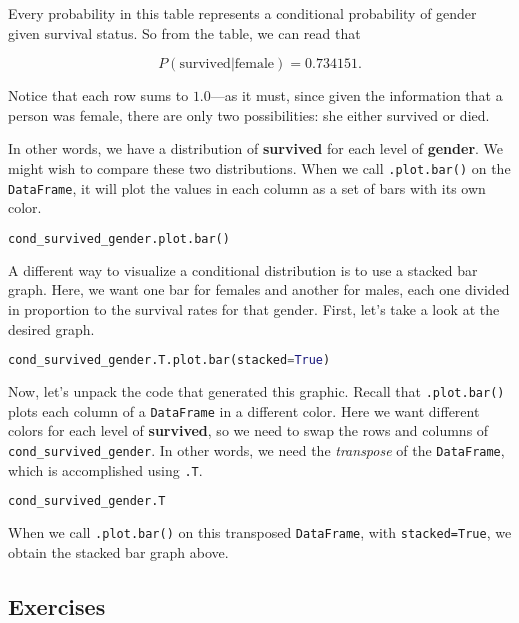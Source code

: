 Every probability in this table represents a conditional probability of gender given survival status. So from the table, we can read that

$$ P(\text{survived} | \text{female}) = 0.734151. $$

Notice that each row sums to $1.0$---as it must, since given the information that a person was female, there are only two possibilities: she either survived or died.

In other words, we have a distribution of \textbf{survived} for each level of \textbf{gender}. We might wish to compare these two distributions. When we call \verb|.plot.bar()| on the \verb|DataFrame|, it will plot the values in each column as a set of bars with its own color.

\begin{lstlisting}[language=Python]
cond_survived_gender.plot.bar()
\end{lstlisting}




A different way to visualize a conditional distribution is to use a stacked bar graph. Here, we want one bar for females and another for males, each one divided in proportion to the survival rates for that gender. First, let's take a look at the desired graph.

\begin{lstlisting}[language=Python]
cond_survived_gender.T.plot.bar(stacked=True)
\end{lstlisting}




Now, let's unpack the code that generated this graphic. Recall that \verb|.plot.bar()| plots each column of a \verb|DataFrame| in a different color. Here we want different colors for each level of \textbf{survived}, so we need to swap the rows and columns of \verb|cond_survived_gender|. In other words, we need the \textit{transpose} of the \verb|DataFrame|, which is accomplished using \verb|.T|.

\begin{lstlisting}[language=Python]
cond_survived_gender.T
\end{lstlisting}




When we call \verb|.plot.bar()| on this transposed \verb|DataFrame|, with \verb|stacked=True|, we obtain the stacked bar graph above.



\subsection{Exercises}\label{2.2.3}




